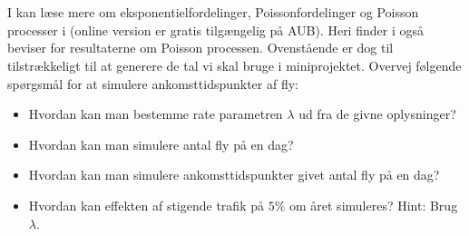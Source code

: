 \\ \\
I kan læse mere om eksponentielfordelinger, Poissonfordelinger og Poisson processer i \cite{olofsson2012} (online version er gratis tilgængelig på AUB). Heri finder i også beviser for resultaterne om Poisson processen. Ovenstående er dog til tilstrækkeligt til at generere de tal vi skal bruge i miniprojektet. Overvej følgende spørgsmål for at simulere ankomsttidspunkter af fly: 
\begin{itemize}
\item Hvordan kan man bestemme rate parametren $\lambda$ ud fra de givne oplysninger? 
\item Hvordan kan man simulere antal fly på en dag?
\item Hvordan kan man simulere ankomsttidspunkter givet antal fly på en dag?  
\item Hvordan kan effekten af stigende trafik på $5\%$ om året simuleres? Hint: Brug $\lambda$. 
\end{itemize}